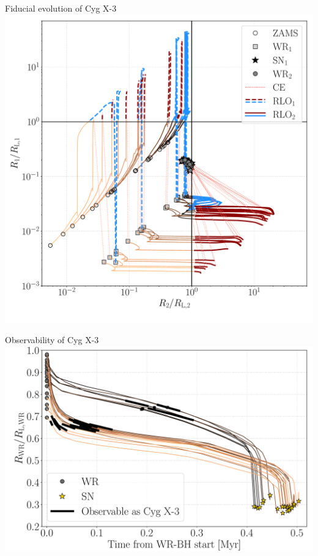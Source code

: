 \documentclass{beamer} %
\begin{document}
\begin{frame}[noframenumbering]{Fiducial evolution of Cyg X-3}
	\centering
	\includegraphics[width=.8\textwidth]{./images/RLfill1_RLfill0_BHBH_GW_WRBH_cyg_x-3--Ko17.pdf}
\end{frame}


\begin{frame}[noframenumbering]{Observability of Cyg X-3}
	\includegraphics[width=\textwidth]{./images/BWorldtime_RLfill1_BHBH_GW_WRBH_cyg_x-3--Ko17.pdf}
\end{frame}
\end{document}
